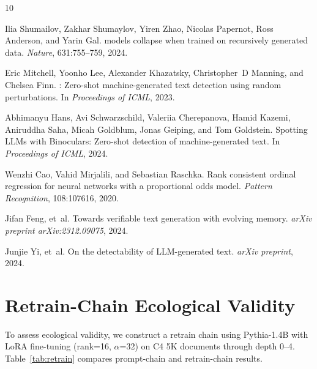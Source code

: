 \documentclass[11pt,a4paper]{article}
\begin{document}

\begin{thebibliography}{10}

Ilia Shumailov, Zakhar Shumaylov, Yiren Zhao, Nicolas Papernot, Ross Anderson, and Yarin Gal.
 models collapse when trained on recursively generated data.
\newblock \emph{Nature}, 631:755--759, 2024.

Eric Mitchell, Yoonho Lee, Alexander Khazatsky, Christopher~D Manning, and Chelsea Finn.
: Zero-shot machine-generated text detection using random perturbations.
\newblock In \emph{Proceedings of ICML}, 2023.

Abhimanyu Hans, Avi Schwarzschild, Valeriia Cherepanova, Hamid Kazemi, Aniruddha Saha, Micah Goldblum, Jonas Geiping, and Tom Goldstein.
\newblock Spotting {LLMs} with {B}inoculars: Zero-shot detection of machine-generated text.
\newblock In \emph{Proceedings of ICML}, 2024.

Wenzhi Cao, Vahid Mirjalili, and Sebastian Raschka.
\newblock Rank consistent ordinal regression for neural networks with a proportional odds model.
\newblock \emph{Pattern Recognition}, 108:107616, 2020.

Jifan Feng, et~al.
\newblock Towards verifiable text generation with evolving memory.
\newblock \emph{arXiv preprint arXiv:2312.09075}, 2024.

Junjie Yi, et~al.
\newblock On the detectability of {LLM}-generated text.
\newblock \emph{arXiv preprint}, 2024.

\end{thebibliography}

\appendix

\section{Retrain-Chain Ecological Validity}
\label{app:retrain}

To assess ecological validity, we construct a retrain chain using Pythia-1.4B with LoRA fine-tuning (rank=16, $\alpha$=32) on C4 5K documents through depth 0--4.
Table~\ref{tab:retrain} compares prompt-chain and retrain-chain results.
\end{document}
